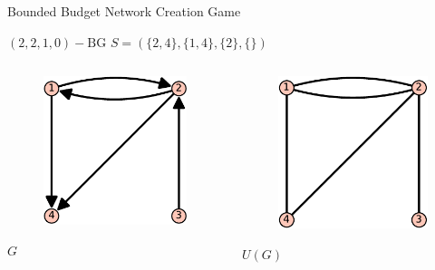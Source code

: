 \documentclass[aspectratio=169]{beamer}
\begin{document}
\begin{frame}{Bounded Budget Network Creation Game}
    
    
    \begin{center}
    $(2,2,1,0)-\text{BG}$ \qquad $S = (\{2,4\},\{1,4\},\{2\},\{\})$
    \end{center}

    \vspace{1em}

    \begin{columns}
        \begin{column}{0.5\textwidth}
        \centering
        \begin{figure}
        \includegraphics[scale=0.75]{digraph-crop}
        \end{figure}
        \vspace{-1em}
        {\large $G$}
        \end{column}
        
        \begin{column}{0.5\textwidth}
        \centering
        \begin{figure}
        \includegraphics[scale=0.75]{u-crop}
        \end{figure}
        \vspace{-1em}
        {\large $U(G)$}
        \end{column}
    \end{columns}    
    
\end{frame}
\end{document}
